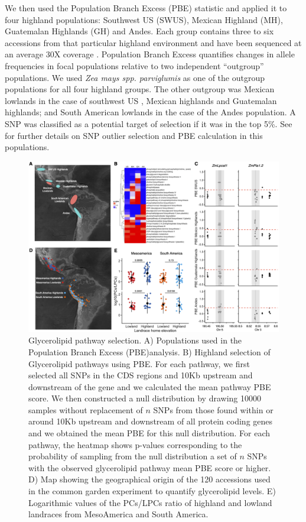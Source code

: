 \documentclass[9pt,twocolumn,twoside]{BioRxiv}
\begin{document}
We then used the Population Branch Excess (PBE) statistic \citep{Pool2017-oa} and applied it to four highland populations: Southwest US (SWUS), Mexican Highland (MH), Guatemalan Highlands (GH) and Andes. 
Each group contains three to six accessions from that particular highland environment and have been sequenced at an average 30X coverage \citep{Wang2017-bc, Wang2020-mp}. 
Population Branch Excess quantifies changes in allele frequencies in focal populations relative to two independent “outgroup” populations. 
We used \textit{Zea mays spp. parviglumis} as one of the outgroup populations for all four highland groups.  
The other outgroup was  Mexican lowlands  in the case of southwest US , Mexican highlands and Guatemalan highlands; and South American lowlands in the case of the Andes population. 
A SNP was classified as a potential target of selection if it was in the top 5\%. 
See \cite{Wang2020-mp} for further details on SNP outlier selection and PBE calculation in this populations. 
\begin{figure}[h]
\begin{center}
\includegraphics[width=0.7\paperwidth]{Figures/Fig_1.png}
\caption{Glycerolipid pathway selection. 
A) Populations used in the Population Branch Excess (PBE)analysis. 
B) Highland selection of Glycerolipid pathways using PBE. 
For each pathway, we first selected all SNPs in the CDS regions and 10Kb upstream and downstream of the gene and we calculated the mean pathway PBE score. 
We then constructed a null distribution by drawing 10000 samples without replacement of $n$ SNPs from those found within or around 10Kb upstream and downstream of all protein coding genes and we obtained the mean PBE for this null distribution. 
For each pathway, the heatmap shows p-values corresponding to the probability of sampling from the null distribution a set of $n$ SNPs with the observed glycerolipid pathway mean PBE score or higher.
D) Map showing the geographical origin of the 120 accessions used in the common garden experiment to quantify glycerolipid levels.
E) Logarithmic values of the PCs/LPCs ratio of highland and lowland landraces from MesoAmerica and South America.
} 
\label{Fig1}
\end{center}
\end{figure} 
\end{document}
